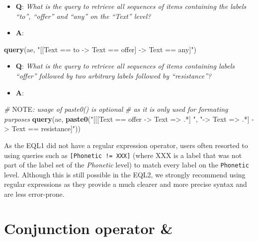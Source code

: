 \documentclass[]{book}
\newenvironment{Shaded}{\begin{snugshade}}{\end{snugshade}}
\newcommand{\AlertTok}[1]{\textcolor[rgb]{0.94,0.16,0.16}{#1}}
\newcommand{\CommentTok}[1]{\textcolor[rgb]{0.56,0.35,0.01}{\textit{#1}}}
\newcommand{\KeywordTok}[1]{\textcolor[rgb]{0.13,0.29,0.53}{\textbf{#1}}}
\newcommand{\NormalTok}[1]{#1}
\newcommand{\StringTok}[1]{\textcolor[rgb]{0.31,0.60,0.02}{#1}}
\providecommand{\tightlist}{%
  \setlength{\itemsep}{0pt}\setlength{\parskip}{0pt}}
\theoremstyle{definition}
\theoremstyle{definition}
\theoremstyle{definition}
\theoremstyle{remark}
\begin{document}
\begin{itemize}
\tightlist
\item
  \textbf{Q}: \emph{What is the query to retrieve all sequences of items
  containing the labels ``to'', ``offer'' and ``any'' on the ``Text''
  level?}
\item
  \textbf{A}:
\end{itemize}

\begin{Shaded}
\begin{Highlighting}[]
\KeywordTok{query}\NormalTok{(ae, }\StringTok{"[[Text == to -> Text == offer] -> Text == any]"}\NormalTok{)}
\end{Highlighting}
\end{Shaded}

\begin{itemize}
\tightlist
\item
  \textbf{Q}: \emph{What is the query to retrieve all sequences of items
  containing labels ``offer'' followed by two arbitrary labels followed
  by ``resistance''?}
\item
  \textbf{A}:
\end{itemize}

\begin{Shaded}
\begin{Highlighting}[]
\CommentTok{# }\AlertTok{NOTE}\CommentTok{: usage of paste0() is optional}
\CommentTok{# as it is only used for formating purposes}
\KeywordTok{query}\NormalTok{(ae, }\KeywordTok{paste0}\NormalTok{(}\StringTok{"[[[Text == offer -> Text => .*] "}\NormalTok{,}
                 \StringTok{"-> Text => .*] -> Text == resistance]"}\NormalTok{))}
\end{Highlighting}
\end{Shaded}

As the EQL1 did not have a regular expression operator, users often
resorted to using queries such as \texttt{{[}Phonetic\ !=\ XXX{]}}
(where XXX is a label that was not part of the label set of the
\emph{Phonetic} level) to match every label on the \texttt{Phonetic}
level. Although this is still possible in the EQL2, we strongly
recommend using regular expressions as they provide a much clearer and
more precise syntax and are less error-prone.

\hypertarget{conjunction-operator}{%
\section{Conjunction operator \&}\label{conjunction-operator}}
\end{document}
